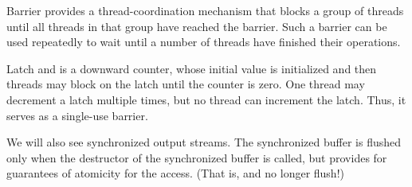 Barrier provides a thread-coordination mechanism that blocks a group of threads until all threads in that group have reached the barrier. Such a barrier can be used repeatedly to wait until a number of threads have finished their operations. 

Latch and is a downward counter, whose initial value is initialized and then threads may block on the latch until the counter is  zero. One thread may decrement a latch multiple times, but no thread can increment the latch. Thus, it serves as a single-use barrier.

We will also see synchronized output streams. The synchronized buffer is flushed only when the destructor of the synchronized buffer is called, but provides for guarantees of atomicity for the access. (That is,  and  no longer flush!)